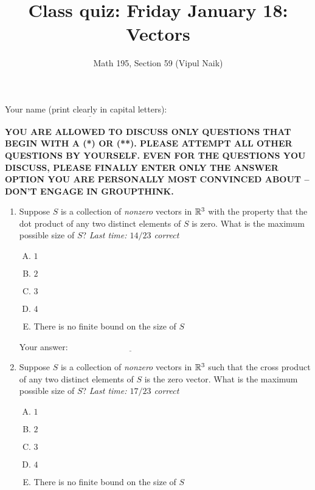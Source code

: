 \documentclass[10pt]{amsart}
\title{Class quiz: Friday January 18: Vectors}
\author{Math 195, Section 59 (Vipul Naik)}
\begin{document}
\maketitle

Your name (print clearly in capital letters): $\underline{\qquad\qquad\qquad\qquad\qquad\qquad\qquad\qquad\qquad\qquad}$

\vspace{0.1in}

{\bf YOU ARE ALLOWED TO DISCUSS ONLY QUESTIONS THAT BEGIN WITH A (*)
  OR (**). PLEASE ATTEMPT ALL OTHER QUESTIONS BY YOURSELF. EVEN FOR
  THE QUESTIONS YOU DISCUSS, PLEASE FINALLY ENTER ONLY THE ANSWER
  OPTION YOU ARE PERSONALLY MOST CONVINCED ABOUT -- DON'T ENGAGE IN
  GROUPTHINK.}

\begin{enumerate}

\item Suppose $S$ is a collection of {\em nonzero} vectors in $\mathbb{R}^3$
  with the property that the dot product of any two distinct elements
  of $S$ is zero. What is the maximum possible size of $S$? {\em Last
    time: $14/23$ correct}

  \begin{enumerate}[(A)]
  \item $1$
  \item $2$
  \item $3$
  \item $4$
  \item There is no finite bound on the size of $S$
  \end{enumerate}

  \vspace{0.1in}
  Your answer: $\underline{\qquad\qquad\qquad\qquad\qquad\qquad\qquad}$
  \vspace{0.6in}

\item Suppose $S$ is a collection of {\em nonzero} vectors in $\mathbb{R}^3$
  such that the cross product of any two distinct elements of $S$ is
  the zero vector. What is the maximum possible size of $S$? {\em Last
    time: $17/23$ correct}

  \begin{enumerate}[(A)]
  \item $1$
  \item $2$
  \item $3$
  \item $4$
  \item There is no finite bound on the size of $S$
  \end{enumerate}


\end{enumerate}
\end{document}
